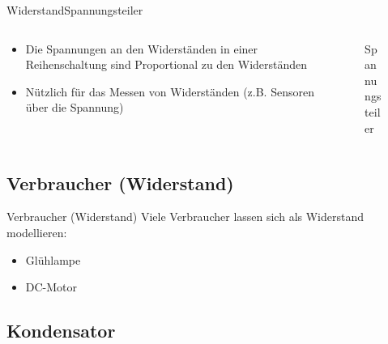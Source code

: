 \documentclass[aspectratio=169]{beamer}
\begin{document}
\begin{frame}{Widerstand}{Spannungsteiler}
    \begin{columns}
        \begin{column}{0.5\textwidth}
        \begin{itemize}
            \item Die Spannungen an den Widerständen in einer Reihenschaltung sind Proportional zu den Widerständen \pause \\
            \item Nützlich für das Messen von Widerständen (z.B. Sensoren über die Spannung) \pause
        \end{itemize}
        \end{column}
        \begin{column}{0.5\textwidth}
            \begin{figure}[t]
                \centering
                \caption{Spannungsteiler}
            \end{figure}
        \end{column}
    \end{columns}
\end{frame}

\subsection{Verbraucher (Widerstand)}

\begin{frame}{Verbraucher (Widerstand)}
    Viele Verbraucher lassen sich als Widerstand modellieren:
    \begin{itemize}
        \item Glühlampe
        \item DC-Motor
    \end{itemize}
\end{frame}

\subsection{Kondensator}
\end{document}
